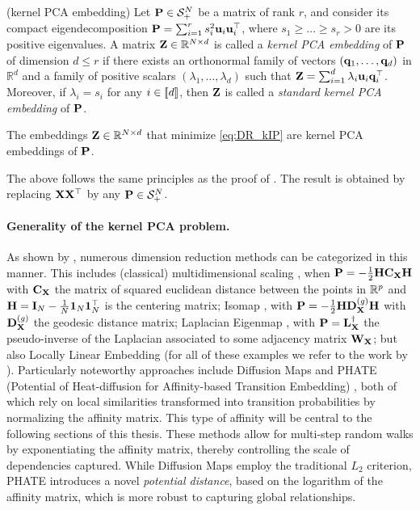 \begin{definition}{(kernel PCA embedding)}
    Let ${\mathbf{P}} \in \mathcal{S}^N_{+}$ be a matrix of rank $r$, and consider its compact eigendecomposition ${\mathbf{P}} = \sum_{i=1}^{r} s_i^2 {\mathbf{u}}_i {\mathbf{u}}_i^\top$, where $s_1 \geq \dots \geq s_r > 0$ are its positive eigenvalues. A matrix ${\mathbf{Z}} \in \mathbb{R}^{N \times d}$ is called a \emph{kernel PCA embedding} of ${\mathbf{P}}$ of dimension $d \leq r$ if there exists an orthonormal family of vectors $({\mathbf{q}}_1, \dots, {\mathbf{q}}_d)$ in $\mathbb{R}^d$ and a family of positive scalars $(\lambda_1, \dots, \lambda_d)$ such that ${\mathbf{Z}} = \sum_{i=1}^{d} \lambda_i {\mathbf{u}}_i {\mathbf{q}}_i^\top$. Moreover, if $\lambda_i = s_i$ for any $i \in {[\![d]\!]}$, then ${\mathbf{Z}}$ is called a \emph{standard kernel PCA embedding} of ${\mathbf{P}}$.
\end{definition}

\begin{proposition}\label{prop:kernel_PCA_embedding}
    The embeddings ${\mathbf{Z}} \in \mathbb{R}^{N \times d}$ that minimize \ref{eq:DR_kIP} are kernel PCA embeddings of ${\mathbf{P}}$.
\end{proposition}

The above  follows the same principles as the proof of . The result is obtained by replacing ${\mathbf{X}} {\mathbf{X}}^\top$ by any ${\mathbf{P}} \in \mathcal{S}^N_{+}$.

\paragraph{Generality of the kernel PCA problem.}
As shown by \citet{ham2004kernel, ghojogh2021unified}, numerous dimension reduction methods can be categorized in this manner.
This includes 
(classical) multidimensional scaling \citep{borg2005modern}, when ${\mathbf{P}} = -\frac{1}{2} {\mathbf{H}} {\mathbf{C}}_{\mathbf{X}} {\mathbf{H}}$ with ${\mathbf{C}}_{\mathbf{X}}$ the matrix of squared euclidean distance between the points in $\mathbb{R}^{p}$ and ${\mathbf{H}} = {\mathbf{I}}_N - \frac{1}{N} \bm{1}_N \bm{1}_N^\top$ is the centering matrix; Isomap \citep{tenenbaum2000global}, with ${\mathbf{P}} = -\frac{1}{2} {\mathbf{H}} {\mathbf{D}}_{\mathbf{X}}^{(g)} {\mathbf{H}}$ with ${\mathbf{D}}_{\mathbf{X}}^{(g)}$ the geodesic distance matrix; Laplacian Eigenmap
\citep{belkin2003laplacian}, with ${\mathbf{P}} = {\mathbf{L}}_{\mathbf{X}}^{\dagger}$ the pseudo-inverse of the Laplacian associated to some adjacency matrix ${\mathbf{W}}_{\mathbf{X}}$; but also Locally Linear Embedding \citep{roweis2000nonlinear} (for all of these examples we refer to the work by \citealt[Table 1]{ghojogh2021unified}). Particularly noteworthy approaches include Diffusion Maps \citep{coifman2006diffusion} and PHATE (Potential of Heat-diffusion for Affinity-based Transition Embedding) \citep{moon2019visualizing}, both of which rely on local similarities transformed into transition probabilities by normalizing the affinity matrix. This type of affinity will be central to the following sections of this thesis. These methods allow for multi-step random walks by exponentiating the affinity matrix, thereby controlling the scale of dependencies captured. While Diffusion Maps employ the traditional $L_2$ criterion, PHATE introduces a novel \emph{potential distance}, based on the logarithm of the affinity matrix, which is more robust to capturing global relationships.


